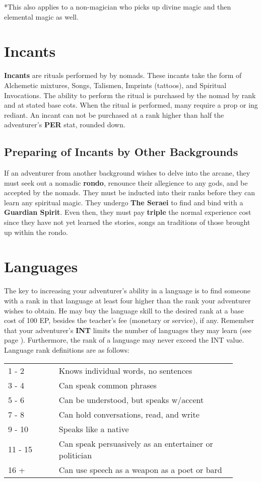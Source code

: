 \begin{multicols*}{2}
*This also applies to a non-magician who picks up divine magic and then elemental magic as well.

\section{Incants}
\textbf{Incants} are rituals performed by by nomads. These
incants take the form of Alchemetic mixtures, Songs, Talismen, Imprints (tattoos), and Spiritual Invocations. The ability to perform the ritual is purchased by the nomad by
rank and at stated base cots. When the ritual is performed, many require a prop or ing rediant. An incant can not be purchased at a rank higher than half the adventurer's \textbf{PER} stat, rounded down.
\subsection{Preparing of Incants by Other Backgrounds}
If an adventurer from another background wishes to delve into the arcane, they must seek out a nomadic \textbf{rondo}, renounce their allegience to any gods, and be accepted by the nomads. They must be inducted into their ranks before they can learn any spiritual magic. They undergo \textbf{The Seraei} to find and bind with a \textbf{Guardian Spirit}. Even then, they must pay \textbf{triple} the normal experience cost since they have not yet learned the stories, songs an traditions of those brought up within the rondo.
\section{Languages}
The key to increasing your adventurer's ability in a language is to find someone with a rank in that language at least four higher than the rank your adventurer wishes to obtain. He may buy the language skill to the desired rank at a base cost of 100 EP, besides the teacher's fee (monetary or service), if any. Remember that your adventurer's \textbf{INT} limits the number of languages they may learn (see page \textbf{\pageref{create-language}}). Furthermore, the rank of a language may never exceed the
INT value. Language rank definitions are as follows:

\begin{tcolorbox}[enhanced,breakable,boxrule=0pt,title=\textbf{Language Rank Definitions}]
\begin{tabular}{p{0.2\linewidth} p{0.7\linewidth}}
1 - 2  & Knows individual words, no sentences\\
3 - 4  & Can speak common phrases\\
5 - 6  & Can be understood, but speaks w/accent\\
7 - 8  & Can hold conversations, read, and write\\
9 - 10  & Speaks like a native\\
11 - 15  & Can speak persuasively as an entertainer or politician\\
16 + & Can use speech as a weapon as a poet or bard\\
\end{tabular}
\end{tcolorbox}

\end{multicols*}
